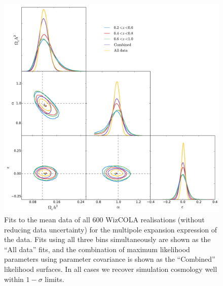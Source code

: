 \documentclass[titlesmallcaps, examinerscopy, copyrightpage]{uqthesis}
\begin{document}
\begin{figure}[h!]
  \begin{center}
    \includegraphics[width=\textwidth]{images/corCombinedMPWiz.pdf}
  \end{center}
  \caption{Fits to the mean data of all 600 WizCOLA realisations (without reducing data uncertainty) for the multipole expansion expression of the data. Fits using all three bins simultaneously are shown as the ``All data'' fits, and the combination of maximum likelihood parameters using parameter covariance is shown as the ``Combined'' likelihood surfaces. In all cases we recover simulation cosmology well within $1-\sigma$ limits.}
  \label{fig:corCombinedMPWiz}
\end{figure}
\end{document}
